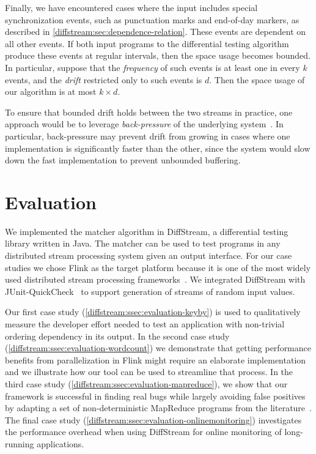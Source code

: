 Finally, we have encountered cases where the input includes special synchronization events, such as punctuation marks and end-of-day markers, as described in \cref{diffstream:sec:dependence-relation}. These events are dependent on all other events. If both input programs to the differential testing algorithm produce these events at regular intervals, then the space usage becomes bounded. In particular, suppose that the \emph{frequency} of such events is at least one in every $k$ events, and the \emph{drift} restricted only to such events is $d$. Then the space usage of our algorithm is at most $k \times d$.

To ensure that bounded drift holds between the two streams in practice, one approach would be to leverage \emph{back-pressure} of the underlying system~\cite{collins2009flexible,kulkarni2015twitter-heron,chen2017governor}.
In particular, back-pressure may prevent drift from growing in cases where one implementation is significantly faster than the other, since the system would slow down the fast implementation to prevent unbounded buffering.

\section{Evaluation}
\label{diffstream:sec:evaluation}

We implemented the matcher algorithm in DiffStream, a differential
testing library written in Java. The matcher can be used to test
programs in any distributed stream processing system given an output
interface. For our case studies we chose Flink as the target platform
because it is one of the most widely used distributed stream
processing
frameworks~\cite{stackoverflow-flink}. We
integrated DiffStream with JUnit-QuickCheck~\cite{junit-quickcheck} to
support generation of streams of random input values.

Our first case study (\cref{diffstream:ssec:evaluation-keyby}) is used to qualitatively measure the developer effort needed to test an application with non-trivial ordering dependency in its output. In the second case study (\cref{diffstream:ssec:evaluation-wordcount}) we demonstrate that getting performance benefits from parallelization in Flink might require an elaborate implementation and we illustrate how our tool can be used to streamline that process. In the third case study (\cref{diffstream:ssec:evaluation-mapreduce}), we show that our framework is successful in finding real bugs while largely avoiding false positives by adapting a set of non-deterministic MapReduce programs from the literature~\cite{xiao2014nondeterminism}. The final case study (\cref{diffstream:ssec:evaluation-onlinemonitoring}) investigates the performance overhead when using DiffStream{} for online monitoring of long-running applications.

